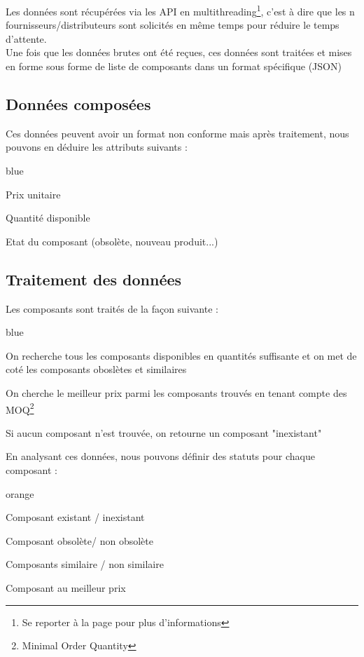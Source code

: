 Les données sont récupérées via les API en multithreading\footnote{Se reporter à la page \pageref{multithrading} pour plus d'informations}, c'est à dire que les n fournisseurs/distributeurs sont solicités en même temps pour réduire le temps d'attente.\\

Une fois que les données brutes ont été reçues, ces données sont traitées et mises en forme sous forme de liste de composants dans un format spécifique (JSON)


\subsection{Données composées}

Ces données peuvent avoir un format non conforme mais après traitement, nous pouvons en déduire les attributs suivants :\\

\begin{items}{blue}{\Bullet}
\item Prix unitaire
\item Quantité disponible
\item Etat du composant (obsolète, nouveau produit...)
\end{items}


\subsection{Traitement des données}


Les composants sont traités de la façon suivante :

\begin{items}{blue}{\Triangle}
\item On recherche tous les composants disponibles en quantités suffisante et on met de coté les composants oboslètes et similaires
\item On cherche le meilleur prix parmi les composants trouvés en tenant compte des MOQ\footnote{Minimal Order Quantity}
\item Si aucun composant n'est trouvée, on retourne un composant "inexistant"
\end{items}

En analysant ces données, nous pouvons définir des statuts pour chaque composant : 

\begin{items}{orange}{\Bullet}
\item Composant existant / inexistant
\item Composant obsolète/ non obsolète
\item Composants similaire / non similaire
\item Composant au meilleur prix
\end{items}

